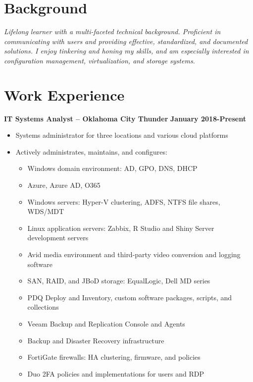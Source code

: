 \documentclass[line]{res}
\begin{document}

\address{Oklahoma City, OK $\parallel$ trjean.ou@gmail.com $\parallel$ (580) 304-6896}

\begin{resume}

\section{Background}
\emph{Lifelong learner with a multi-faceted technical background. Proficient in communicating with users and providing effective, standardized, and documented solutions. I enjoy tinkering and honing my skills, and am especially interested in configuration management, virtualization, and storage systems.}

\section{Work Experience}
\textbf{IT Systems Analyst -- Oklahoma City Thunder}
\newline
\textbf{January 2018-Present}
	\begin{itemize}
		\item Systems administrator for three locations and various cloud platforms
		\item Actively administrates, maintains, and configures:
			\begin{itemize}
				\item Windows domain environment: AD, GPO, DNS, DHCP
				\item Azure, Azure AD, O365 
				\item Windows servers: Hyper-V clustering, ADFS, NTFS file shares, WDS/MDT
				\item Linux application servers: Zabbix, R Studio and Shiny Server development servers
				\item Avid media environment and third-party video conversion and logging software
				\item SAN, RAID, and JBoD storage: EqualLogic, Dell MD series
				\item PDQ Deploy and Inventory, custom software packages, scripts, and collections
				\item Veeam Backup and Replication Console and Agents
				\item Backup and Disaster Recovery infrastructure
				\item FortiGate firewalls: HA clustering, firmware, and policies
				\item Duo 2FA policies and implementations for users and RDP

\end{itemize}
\end{itemize}
\end{resume}
\end{document}
